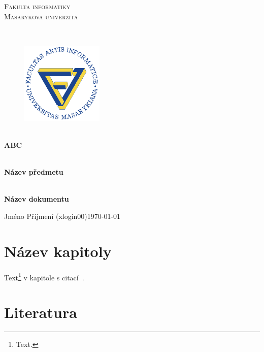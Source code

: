 \documentclass[11pt,a4paper]{article}
\begin{document}
\begin{titlepage}

    \begin{center}
        \vfill {%
            \Huge{%
                \textsc{%
                    Fakulta informatiky\\[3mm]%
                    Masarykova univerzita%
                }%
            }%
        }%

        \hfill\\[15mm]

        \begin{figure}[!h]
            \centering
            \includegraphics[scale=3]{muni-fi-logo.pdf}
        \end{figure}

        \hfill\\[10mm]

        \Huge{
            \textbf{
                ABC
            }
        }

        \hfill\\[-10mm]

        \huge{
            \textbf{
                Název předmetu
            }
        }

        \hfill\\[10mm]

        \LARGE{
            \textbf{
                Název dokumentu
            }
        }
        \vfill

    \end{center}

        \Large{
            \noindent Jméno Příjmení (xlogin00)\hfill \today
        }

\end{titlepage}

\setlength{\parskip}{0pt}
    {
        \hypersetup{
            hidelinks=true
        }
        \tableofcontents
    }
\setlength{\parskip}{0pt}

\newpage

\section{Název kapitoly}

Text\footnote{Text.} v kapitole s citací~\cite{BOOK}.

\newpage

\section{Literatura}

\begin{flushleft}
    
\end{flushleft}
\end{document}
